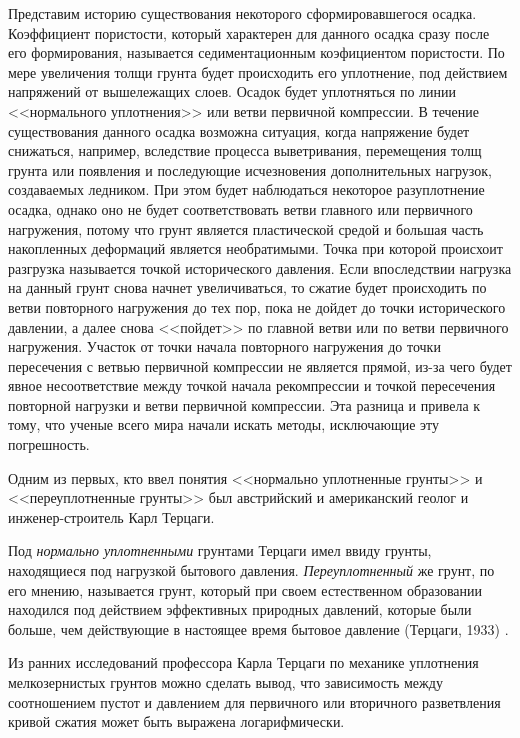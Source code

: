 Представим историю существования некоторого сформировавшегося осадка. 
Коэффициент пористости, который характерен для данного осадка сразу после его формирования, называется седиментационным коэфициентом пористости. 
По мере увеличения толщи грунта будет происходить его уплотнение, под действием напряжений от вышележащих слоев.
Осадок будет уплотняться по линии <<нормального уплотнения>> или ветви первичной компрессии. 
В течение существования данного осадка возможна ситуация, когда напряжение будет снижаться, например, вследствие процесса выветривания, перемещения толщ грунта или появления и последующие исчезновения дополнительных нагрузок, создаваемых ледником. 
При этом будет наблюдаться некоторое разуплотнение осадка, однако оно не будет соответствовать ветви главного или первичного нагружения, потому что грунт является пластической средой и большая часть накопленных деформаций является необратимыми. 
Точка при которой происхоит разгрузка называется точкой исторического давления. 
Если впоследствии нагрузка на данный грунт снова начнет увеличиваться, то сжатие будет происходить по ветви повторного нагружения до тех пор, пока не дойдет до точки исторического давлении, а далее снова <<пойдет>> по главной ветви или по ветви первичного нагружения. 
Участок от точки начала повторного нагружения до точки пересечения с ветвью первичной компрессии не является прямой, из-за чего будет явное несоответствие между точкой начала рекомпрессии и точкой пересечения повторной нагрузки и ветви первичной компрессии. 
Эта разница и привела к тому, что ученые всего мира начали искать методы, исключающие эту погрешность.

Одним из первых, кто ввел понятия <<нормально уплотненные грунты>> и <<переуплотненные грунты>> был австрийский и американский геолог и инженер-строитель Карл Терцаги.

 Под \textit{нормально уплотненными} грунтами Терцаги имел ввиду грунты, находящиеся под нагрузкой бытового давления. \textit{Переуплотненный} же грунт, по его мнению, называется грунт, который при своем естественном образовании находился под действием эффективных природных давлений, которые были больше, чем действующие в настоящее время бытовое давление (Терцаги, 1933) \cite{terz1933}.

Из ранних исследований профессора Карла Терцаги по механике уплотнения мелкозернистых грунтов можно сделать вывод, что зависимость между соотношением пустот и давлением для первичного или вторичного разветвления кривой сжатия может быть выражена логарифмически. 


